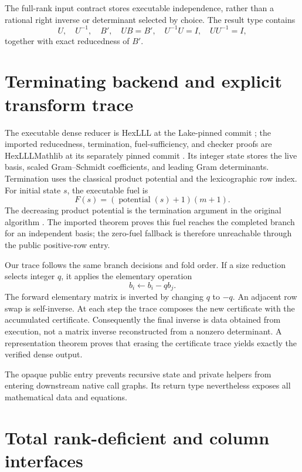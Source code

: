 \documentclass[11pt]{article}
\begin{document}
The full-rank input contract stores executable independence, rather than a
rational right inverse or determinant selected by choice.  The result type
contains
\[
  U,\quad U^{-1},\quad B',\quad UB=B',\quad
  U^{-1}U=I,\quad UU^{-1}=I,
\]
together with exact reducedness of $B'$.

\section{Terminating backend and explicit transform trace}

The executable dense reducer is HexLLL at the Lake-pinned commit
\citep{hexLLL2026}; the imported reducedness, termination, fuel-sufficiency,
and checker proofs are HexLLLMathlib at its separately pinned commit
\citep{hexLLLMathlib2026}.  Its integer
state stores the live basis, scaled Gram--Schmidt coefficients, and leading
Gram determinants.  Termination uses the classical product potential and the
lexicographic row index.  For initial state $s$, the executable fuel is
\[
  F(s)=(\operatorname{potential}(s)+1)(m+1).
\]
The decreasing product potential is the termination argument in the original
algorithm \citep[Section 1, equations (1.23)--(1.25)]{lenstraLenstraLovasz1982}.
The imported theorem proves this fuel reaches the completed branch for an
independent basis; the zero-fuel fallback is therefore unreachable through
the public positive-row entry.

Our trace follows the same branch decisions and fold order.  If a size
reduction selects integer $q$, it applies the elementary operation
\[
  b_i\leftarrow b_i-qb_j.
\]
The forward elementary matrix is inverted by changing $q$ to $-q$.  An
adjacent row swap is self-inverse.  At each step the trace composes the new
certificate with the accumulated certificate.  Consequently the final
inverse is data obtained from execution, not a matrix inverse reconstructed
from a nonzero determinant.  A representation theorem proves that erasing
the certificate trace yields exactly the verified dense output.

The opaque public entry prevents recursive state and private helpers from
entering downstream native call graphs.  Its return type nevertheless exposes
all mathematical data and equations.

\section{Total rank-deficient and column interfaces}
\end{document}

